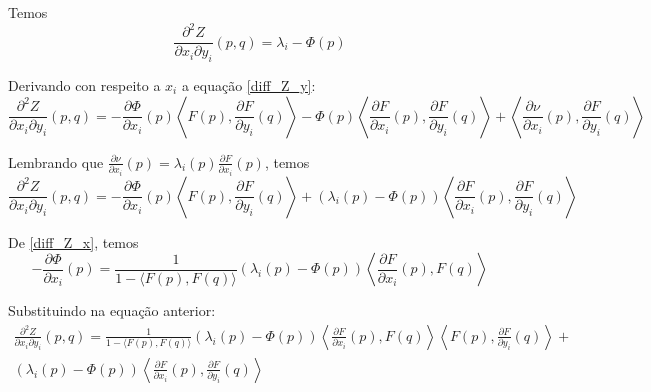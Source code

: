 
\begin{proposicao}
	Temos
	\begin{equation*}
		\frac{\partial^2 Z}{\partial x_i \partial y_i}(p,q) = \lambda_i - \Phi(p)
	\end{equation*}
\end{proposicao}

\begin{demonstracao}
	Derivando con respeito a $x_i$ a equação \ref{diff_Z_y}:
	\begin{equation*}
		\frac{\partial^2 Z}{\partial x_i \partial y_i}(p,q) = -\frac{\partial \Phi}{\partial x_i}(p) \left\langle F(p), \frac{\partial F}{\partial y_i}(q) \right\rangle - \Phi(p) \left\langle \frac{\partial F}{\partial x_i}(p), \frac{\partial F}{\partial y_i}(q) \right\rangle + \left\langle \frac{\partial \nu}{\partial x_i}(p), \frac{\partial F}{\partial y_i}(q) \right\rangle
	\end{equation*}
	
	Lembrando que $\frac{\partial \nu}{\partial x_i}(p) = \lambda_i(p) \frac{\partial F}{\partial x_i}(p)$, temos
	\begin{equation*}
		\frac{\partial^2 Z}{\partial x_i \partial y_i}(p,q) = -\frac{\partial \Phi}{\partial x_i}(p) \left\langle F(p), \frac{\partial F}{\partial y_i}(q) \right\rangle + (\lambda_i(p) - \Phi(p)) \left\langle \frac{\partial F}{\partial x_i}(p), \frac{\partial F}{\partial y_i}(q) \right\rangle
	\end{equation*}
	
	De \ref{diff_Z_x}, temos
	\begin{equation*}
		-\frac{\partial \Phi}{\partial x_i}(p) = \frac{1}{1 - \langle F(p),F(q) \rangle} (\lambda_i(p) - \Phi(p)) \left\langle \frac{\partial F}{\partial x_i}(p), F(q) \right\rangle
	\end{equation*}
	
	Substituindo na equação anterior:
	\begin{multline*}
		\frac{\partial^2 Z}{\partial x_i \partial y_i}(p,q) =  \frac{1}{1 - \langle F(p),F(q) \rangle} (\lambda_i(p) - \Phi(p)) \left\langle \frac{\partial F}{\partial x_i}(p), F(q) \right\rangle  \left\langle F(p), \frac{\partial F}{\partial y_i}(q) \right\rangle +\\
		(\lambda_i(p) - \Phi(p)) \left\langle \frac{\partial F}{\partial x_i}(p), \frac{\partial F}{\partial y_i}(q) \right\rangle
	\end{multline*}
	

\end{demonstracao}
